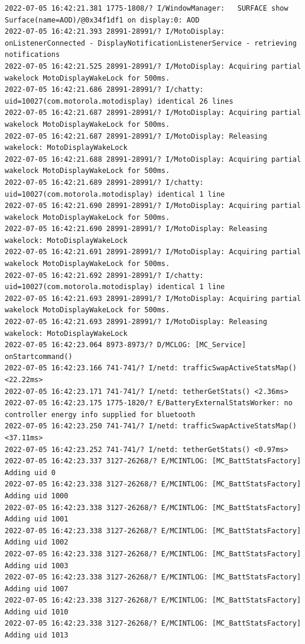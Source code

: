 \documentclass[a4paper,12pt]{book}
\begin{document}
\begin{lstlisting}
2022-07-05 16:42:21.381 1775-1808/? I/WindowManager:   SURFACE show Surface(name=AOD)/@0x34f1df1 on display:0: AOD
2022-07-05 16:42:21.393 28991-28991/? I/MotoDisplay: onListenerConnected - DisplayNotificationListenerService - retrieving notifications
2022-07-05 16:42:21.525 28991-28991/? I/MotoDisplay: Acquiring partial wakelock MotoDisplayWakeLock for 500ms.
2022-07-05 16:42:21.686 28991-28991/? I/chatty: uid=10027(com.motorola.motodisplay) identical 26 lines
2022-07-05 16:42:21.687 28991-28991/? I/MotoDisplay: Acquiring partial wakelock MotoDisplayWakeLock for 500ms.
2022-07-05 16:42:21.687 28991-28991/? I/MotoDisplay: Releasing wakelock: MotoDisplayWakeLock
2022-07-05 16:42:21.688 28991-28991/? I/MotoDisplay: Acquiring partial wakelock MotoDisplayWakeLock for 500ms.
2022-07-05 16:42:21.689 28991-28991/? I/chatty: uid=10027(com.motorola.motodisplay) identical 1 line
2022-07-05 16:42:21.690 28991-28991/? I/MotoDisplay: Acquiring partial wakelock MotoDisplayWakeLock for 500ms.
2022-07-05 16:42:21.690 28991-28991/? I/MotoDisplay: Releasing wakelock: MotoDisplayWakeLock
2022-07-05 16:42:21.691 28991-28991/? I/MotoDisplay: Acquiring partial wakelock MotoDisplayWakeLock for 500ms.
2022-07-05 16:42:21.692 28991-28991/? I/chatty: uid=10027(com.motorola.motodisplay) identical 1 line
2022-07-05 16:42:21.693 28991-28991/? I/MotoDisplay: Acquiring partial wakelock MotoDisplayWakeLock for 500ms.
2022-07-05 16:42:21.693 28991-28991/? I/MotoDisplay: Releasing wakelock: MotoDisplayWakeLock
2022-07-05 16:42:23.064 8973-8973/? D/MCLOG: [MC_Service] onStartcommand()
2022-07-05 16:42:23.166 741-741/? I/netd: trafficSwapActiveStatsMap() <22.22ms>
2022-07-05 16:42:23.171 741-741/? I/netd: tetherGetStats() <2.36ms>
2022-07-05 16:42:23.175 1775-1820/? E/BatteryExternalStatsWorker: no controller energy info supplied for bluetooth
2022-07-05 16:42:23.250 741-741/? I/netd: trafficSwapActiveStatsMap() <37.11ms>
2022-07-05 16:42:23.252 741-741/? I/netd: tetherGetStats() <0.97ms>
2022-07-05 16:42:23.337 3127-26268/? E/MCINTLOG: [MC_BattStatsFactory] Adding uid 0
2022-07-05 16:42:23.338 3127-26268/? E/MCINTLOG: [MC_BattStatsFactory] Adding uid 1000
2022-07-05 16:42:23.338 3127-26268/? E/MCINTLOG: [MC_BattStatsFactory] Adding uid 1001
2022-07-05 16:42:23.338 3127-26268/? E/MCINTLOG: [MC_BattStatsFactory] Adding uid 1002
2022-07-05 16:42:23.338 3127-26268/? E/MCINTLOG: [MC_BattStatsFactory] Adding uid 1003
2022-07-05 16:42:23.338 3127-26268/? E/MCINTLOG: [MC_BattStatsFactory] Adding uid 1007
2022-07-05 16:42:23.338 3127-26268/? E/MCINTLOG: [MC_BattStatsFactory] Adding uid 1010
2022-07-05 16:42:23.338 3127-26268/? E/MCINTLOG: [MC_BattStatsFactory] Adding uid 1013

\end{lstlisting}
\end{document}
